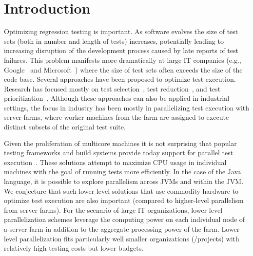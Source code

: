 \section{Introduction}

Optimizing regression testing is important.  As software evolves the
size of test sets (both in number and length of tests) increases,
potentially leading to increasing disruption of the development
process caused by late reports of test failures.  This problem
manifests more dramatically at large IT companies (e.g., Google~ and Microsoft~)
where the size of test sets often exceeds the size of the code base.
Several approaches have been proposed to optimize test execution.
Research has focused mostly on test selection~, test
reduction~, and test prioritization~.  Although
these approaches can also be applied in industrial settings, the focus
in industry has been mostly in parallelizing test execution with
server farms, where worker machines from the farm are assigned to
execute distinct subsets of the original test suite.

Given the proliferation of multicore machines it is not surprising
that popular testing frameworks and build systems provide today
support for parallel test execution~.  These solutions
attempt to maximize CPU usage in individual machines with the goal of
running tests more efficiently.  In the case of the Java language, it
is possible to explore parallelism across JVMs and within the JVM.  We
conjecture that such lower-level solutions that use commodity hardware
to optimize test execution are also important (compared to
higher-level parallelism from server farms).  For the scenario of
large IT organizations, lower-level parallelization schemes leverage
the computing power on each individual node of a server farm in
addition to the aggregate processing power of the farm.  Lower-level
parallelization fits particularly well smaller organizations
(/projects) with relatively high testing costs but lower budgets.


